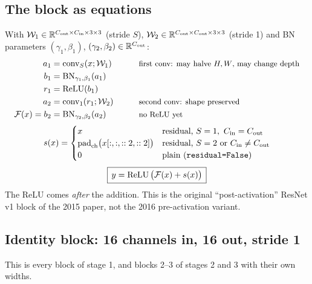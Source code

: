 \subsection{The block as equations}

\begin{repo}
With $\mathcal W_1\in\mathbb{R}^{C_\text{out}\times C_\text{in}\times3\times3}$ (stride $S$), $\mathcal W_2\in\mathbb{R}^{C_\text{out}\times C_\text{out}\times3\times3}$ (stride 1) and BN parameters $(\gamma_1,\beta_1)$, $(\gamma_2,\beta_2)\in\mathbb{R}^{C_\text{out}}$:
\begin{alignat*}{2}
  a_1 &= \operatorname{conv}_{S}(x;\mathcal W_1) &&\qquad\text{\small first conv: may halve $H,W$, may change depth}\\
  b_1 &= \operatorname{BN}_{\gamma_1,\beta_1}(a_1)\\
  r_1 &= \operatorname{ReLU}(b_1)\\
  a_2 &= \operatorname{conv}_{1}(r_1;\mathcal W_2) &&\qquad\text{\small second conv: shape preserved}\\
  \mathcal F(x) = b_2 &= \operatorname{BN}_{\gamma_2,\beta_2}(a_2) &&\qquad\text{\small no ReLU yet}
\end{alignat*}
\[
  s(x) = \begin{cases}
    x & \text{residual, } S=1,\ C_\text{in}=C_\text{out}\\
    \operatorname{pad}_\text{ch}\!\big(x[:,:,::2,::2]\big) & \text{residual, } S=2 \text{ or } C_\text{in}\neq C_\text{out}\\
    0 & \text{plain (\texttt{residual=False})}
  \end{cases}
\]
\[
  \boxed{\,y = \operatorname{ReLU}\big(\mathcal F(x) + s(x)\big)\,}
\]
The ReLU comes \emph{after} the addition. This is the original ``post-activation'' ResNet v1 block of the 2015 paper, not the 2016 pre-activation variant.
\end{repo}

\subsection{Identity block: 16 channels in, 16 out, stride 1}
\label{sec:idblock}

This is every block of stage 1, and blocks 2--3 of stages 2 and 3 with their own widths.

